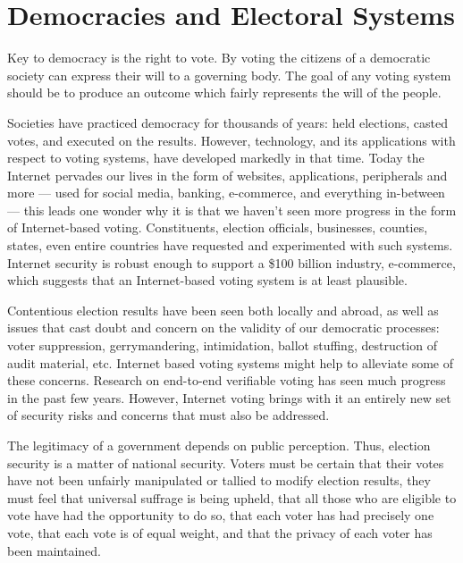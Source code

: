 \section{Democracies and Electoral Systems}


Key to democracy is the right to vote. By voting the citizens of a democratic
society can express their will to a governing body. The goal of any voting
system should be to produce an outcome which fairly represents the will of the
people.

Societies have practiced democracy for thousands of years: held elections,
casted votes, and executed on the results. However, technology, and its
applications with respect to voting systems, have developed markedly in that
time. Today the Internet pervades our lives in the form of websites,
applications, peripherals and more --- used for social media, banking,
e-commerce, and everything in-between --- this leads one wonder why it is that
we haven't seen more progress in the form of Internet-based voting.
Constituents, election officials, businesses, counties, states, even entire
countries have requested and experimented with such systems. Internet security
is robust enough to support a \$100 billion industry, e-commerce, which suggests
that an Internet-based voting system is at least plausible.

Contentious election results have been seen both locally and abroad, as well as
issues that cast doubt and concern on the validity of our democratic processes:
voter suppression, gerrymandering, intimidation, ballot stuffing, destruction of
audit material, etc. Internet based voting systems might help to alleviate some
of these concerns. Research on end-to-end verifiable voting has seen much
progress in the past few years. However, Internet voting brings with it an
entirely new set of security risks and concerns that must also be addressed.

The legitimacy of a government depends on public perception. Thus, election
security is a matter of national security. Voters must be certain that their
votes have not been unfairly manipulated or tallied to modify election results,
they must feel that universal suffrage is being upheld, that all those who are
eligible to vote have had the opportunity to do so, that each voter has had
precisely one vote, that each vote is of equal weight, and that the privacy of
each voter has been maintained.

